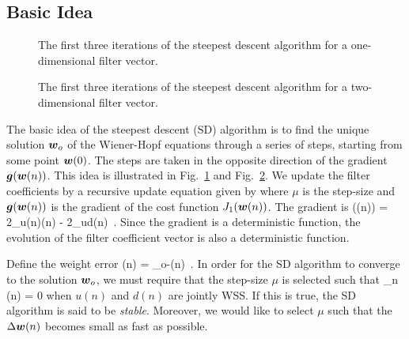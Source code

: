 \subsection{Basic Idea}
\begin{figure}[htbp]
  \centering
  \caption{The first three iterations of the steepest descent algorithm for a one-dimensional filter vector.}
  \label{fig:steepest_descent_idea_2d}
\end{figure}
\begin{figure}[htbp]
  \centering
  \caption{The first three iterations of the steepest descent algorithm for a two-dimensional filter vector.}
  \label{fig:steepest_descent_idea_3d}
\end{figure}
The basic idea of the steepest descent (SD) algorithm is to find the unique solution $\boldsymbol{w}_o$ of the Wiener-Hopf equations through a series of steps, starting from some point $\boldsymbol{w}(0)$. The steps are taken in the opposite direction of the gradient $\boldsymbol{g}(\boldsymbol{w}(n))$. This idea is illustrated in Fig.~\ref{fig:steepest_descent_idea_2d} and Fig.~\ref{fig:steepest_descent_idea_3d}. We update the filter coefficients by a recursive update equation given by
\bmath
\emath
where $\mu$ is the step-size and $\boldsymbol{g}(\boldsymbol{w}(n))$ is the gradient of the cost function $J_1(\boldsymbol{w}(n))$. The gradient is
\bmath
  ((n)) = 2_u(n)(n) - 2_{ud}(n)\ .
\emath
Since the gradient is a deterministic function, the evolution of the filter coefficient vector is also a deterministic function.

Define the weight error
\bmath
  \Delta{}(n) = _o-(n)\ .
\emath
In order for the SD algorithm to converge to the solution $\boldsymbol{w}_o$, we must require that the step-size $\mu$ is selected such that
\bmath
  \lim_{n\to\infty} \Delta{}(n) = 0
  \label{eq:sd_stability_req}
\emath
when $u(n)$ and $d(n)$ are jointly WSS. If this is true, the SD algorithm is said to be \textit{stable}. Moreover, we would like to select $\mu$ such that the $\Delta\boldsymbol{w}(n)$ becomes small as fast as possible.

